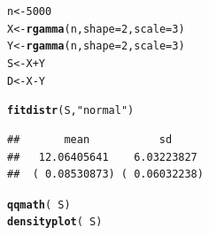\documentclass[twoside]{book}\usepackage[]{graphicx}\usepackage[]{xcolor}
\makeatletter
\newcommand{\hlnum}[1]{\textcolor[rgb]{0.686,0.059,0.569}{#1}}%
\newcommand{\hlstr}[1]{\textcolor[rgb]{0.192,0.494,0.8}{#1}}%
\newcommand{\hlopt}[1]{\textcolor[rgb]{0,0,0}{#1}}%
\newcommand{\hlstd}[1]{\textcolor[rgb]{0.345,0.345,0.345}{#1}}%
\newcommand{\hlkwb}[1]{\textcolor[rgb]{0.69,0.353,0.396}{#1}}%
\newcommand{\hlkwc}[1]{\textcolor[rgb]{0.333,0.667,0.333}{#1}}%
\newcommand{\hlkwd}[1]{\textcolor[rgb]{0.737,0.353,0.396}{\textbf{#1}}}%
\newenvironment{kframe}{%
 \def\at@end@of@kframe{}%
 \ifinner\ifhmode%
  \def\at@end@of@kframe{\end{minipage}}%
  \begin{minipage}{\columnwidth}%
 \fi\fi%
 \def\FrameCommand##1{\hskip\@totalleftmargin \hskip-\fboxsep
 \colorbox{shadecolor}{##1}\hskip-\fboxsep
     \hskip-\linewidth \hskip-\@totalleftmargin \hskip\columnwidth}%
 \MakeFramed {\advance\hsize-\width
   \@totalleftmargin\z@ \linewidth\hsize
   \@setminipage}}%
 {\par\unskip\endMakeFramed%
 \at@end@of@kframe}
\newenvironment{knitrout}{}{} %
\makeatother
\begin{document}
\begin{solution}
\begin{knitrout}
\color{fgcolor}\begin{kframe}
\begin{alltt}
\hlstd{n} \hlkwb{<-} \hlnum{5000}
\hlstd{X} \hlkwb{<-} \hlkwd{rgamma}\hlstd{( n,}  \hlkwc{shape}\hlstd{=}\hlnum{2}\hlstd{,} \hlkwc{scale}\hlstd{=}\hlnum{3} \hlstd{)}
\hlstd{Y} \hlkwb{<-} \hlkwd{rgamma}\hlstd{( n,}  \hlkwc{shape}\hlstd{=}\hlnum{2}\hlstd{,} \hlkwc{scale}\hlstd{=}\hlnum{3} \hlstd{)}
\hlstd{S} \hlkwb{<-} \hlstd{X} \hlopt{+} \hlstd{Y}
\hlstd{D} \hlkwb{<-} \hlstd{X} \hlopt{-} \hlstd{Y}
\end{alltt}
\end{kframe}
\end{knitrout}
\begin{knitrout}
\color{fgcolor}\begin{kframe}
\begin{alltt}
\hlkwd{fitdistr}\hlstd{( S,} \hlstr{"normal"}\hlstd{)}
\end{alltt}
\begin{verbatim}
##       mean           sd     
##   12.06405641    6.03223827 
##  ( 0.08530873) ( 0.06032238)
\end{verbatim}
\begin{alltt}
\hlkwd{qqmath}\hlstd{(} \hlopt{~} \hlstd{S )}
\hlkwd{densityplot}\hlstd{(} \hlopt{~} \hlstd{S )}
\end{alltt}
\end{kframe}


\end{knitrout}
\end{solution}
\end{document}
